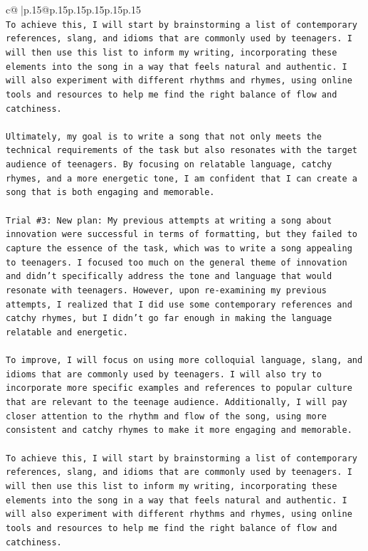\documentclass{article}
\begin{document}
{\begin{supertabular}{c@{$\;$}|p{.15\linewidth}@{}p{.15\linewidth}p{.15\linewidth}p{.15\linewidth}p{.15\linewidth}p{.15\linewidth}}
{{{\\ 
\texttt{To achieve this, I will start by brainstorming a list of contemporary references, slang, and idioms that are commonly used by teenagers. I will then use this list to inform my writing, incorporating these elements into the song in a way that feels natural and authentic. I will also experiment with different rhythms and rhymes, using online tools and resources to help me find the right balance of flow and catchiness.} \\
\\ 
\texttt{Ultimately, my goal is to write a song that not only meets the technical requirements of the task but also resonates with the target audience of teenagers. By focusing on relatable language, catchy rhymes, and a more energetic tone, I am confident that I can create a song that is both engaging and memorable.} \\
\\ 
\texttt{Trial \#3: New plan: My previous attempts at writing a song about innovation were successful in terms of formatting, but they failed to capture the essence of the task, which was to write a song appealing to teenagers. I focused too much on the general theme of innovation and didn't specifically address the tone and language that would resonate with teenagers. However, upon re{-}examining my previous attempts, I realized that I did use some contemporary references and catchy rhymes, but I didn't go far enough in making the language relatable and energetic.} \\
\\ 
\texttt{To improve, I will focus on using more colloquial language, slang, and idioms that are commonly used by teenagers. I will also try to incorporate more specific examples and references to popular culture that are relevant to the teenage audience. Additionally, I will pay closer attention to the rhythm and flow of the song, using more consistent and catchy rhymes to make it more engaging and memorable.} \\
\\ 
\texttt{To achieve this, I will start by brainstorming a list of contemporary references, slang, and idioms that are commonly used by teenagers. I will then use this list to inform my writing, incorporating these elements into the song in a way that feels natural and authentic. I will also experiment with different rhythms and rhymes, using online tools and resources to help me find the right balance of flow and catchiness.} \\
\\ 
}}}
\end{supertabular}}
\end{document}
